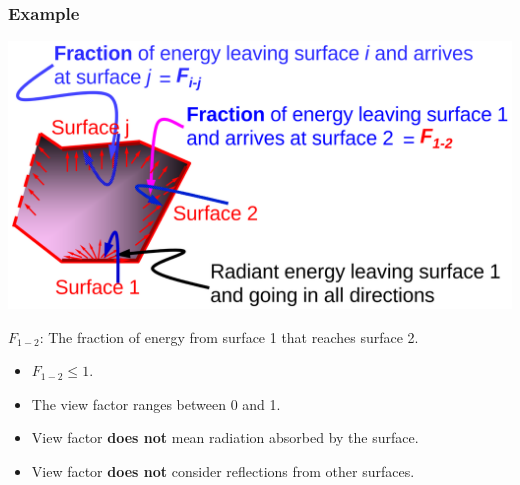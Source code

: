 \documentclass[11pt]{article}
\begin{document}
\subsubsection{Example}
\label{sec:org30be37a}
\begin{center}
\includegraphics[width=.9\linewidth]{./images/view-factor-diagram-with-explanation.png}
\end{center}

\(F_{1-2}\): The fraction of energy from surface 1 that reaches surface 2.
\begin{itemize}
\item \(F_{1-2} \le 1\).
\item The view factor ranges between 0 and 1.
\item View factor \textbf{does not} mean radiation absorbed by the surface.
\item View factor \textbf{does not} consider reflections from other surfaces.
\end{itemize}
\end{document}
